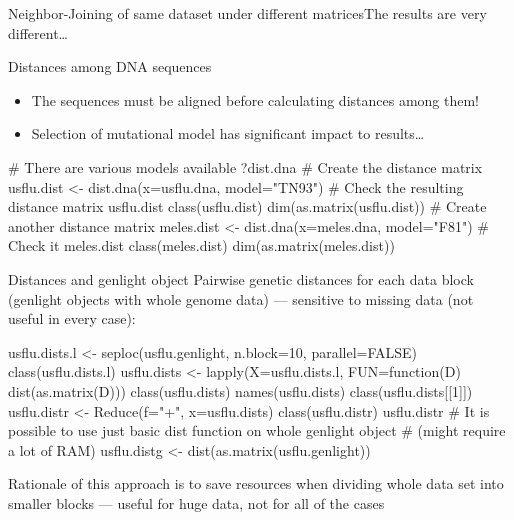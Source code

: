 \documentclass[compress, ucs, xelatex, 11pt, xcolor=svgnames, aspectratio=169,
	hyperref={
		bookmarks=true,
		unicode=true,
		colorlinks=true,
		pdftitle={Molecular data in R},
		plainpages=false,
		pdfauthor={Vojtech Zeisek},
		pdfsubject={Course about phylogeny and evolution in R},
		pdfcreator={XeLaTeX},
		pdfkeywords={R, evolution, phylogeny, molecular data},
		linkcolor=Crimson, %
		anchorcolor=Magenta, %
		citecolor=Magenta, %
		filecolor=Magenta, %
		menucolor=Magenta, %
		urlcolor=DodgerBlue, %
		pdftex},
	url={hyphens, lowtilde} %
	]{beamer}
\renewcommand{\texttt}[1]{\colorbox{Beige}{{\ttfamily #1}}}
\begin{document}
\begin{frame}{Neighbor-Joining of same dataset under different matrices}{The results are very different\ldots}
	\begin{center}
		\texttt{[image: distances.png]}
	\end{center}
\end{frame}

\begin{frame}[fragile]{Distances among DNA sequences}
	\begin{itemize}
		\item \alert{The sequences must be aligned before calculating distances among them!}
		\item Selection of mutational model has significant impact to results\ldots
	\end{itemize}
	\vfill
	\begin{spluscode}
    # There are various models available
    ?dist.dna
    # Create the distance matrix
    usflu.dist <- dist.dna(x=usflu.dna, model="TN93")
    # Check the resulting distance matrix
    usflu.dist
    class(usflu.dist)
    dim(as.matrix(usflu.dist))
    # Create another distance matrix
    meles.dist <- dist.dna(x=meles.dna, model="F81")
    # Check it
    meles.dist
    class(meles.dist)
    dim(as.matrix(meles.dist))
	\end{spluscode}
\end{frame}

\begin{frame}[fragile]{Distances and genlight object}
	\vfill
	Pairwise genetic distances for each data block (genlight objects with whole genome data) --- sensitive to missing data (not useful in every case):
	\vfill
	\begin{spluscode}
    usflu.dists.l <- seploc(usflu.genlight, n.block=10, parallel=FALSE)
    class(usflu.dists.l)
    usflu.dists <- lapply(X=usflu.dists.l, FUN=function(D) dist(as.matrix(D)))
    class(usflu.dists)
    names(usflu.dists)
    class(usflu.dists[[1]])
    usflu.distr <- Reduce(f="+", x=usflu.dists)
    class(usflu.distr)
    usflu.distr
    # It is possible to use just basic dist function on whole genlight object
    # (might require a lot of RAM)
    usflu.distg <- dist(as.matrix(usflu.genlight))
	\end{spluscode}
	\vfil
	Rationale of this approach is to save resources when dividing whole data set into smaller blocks --- useful for huge data, not for all of the cases
	\vfill
\end{frame}
\end{document}
